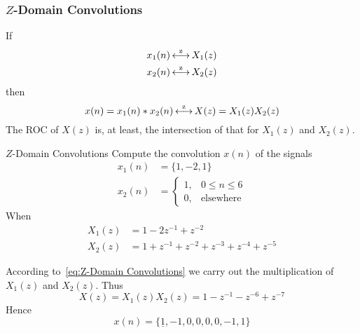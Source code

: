 \subsubsection{\texorpdfstring{$Z$-Domain}{Z-Domain} Convolutions}\label{subsubsec:Z-Domain Convolutions}
If
\begin{equation*}
  \begin{aligned}
    x_{1}(n) &\operatorname{\overset{z}{\longleftrightarrow}} X_{1}(z) \\
    x_{2}(n) &\operatorname{\overset{z}{\longleftrightarrow}} X_{2}(z) \\
  \end{aligned}
\end{equation*}
then
\begin{equation}\label{eq:Z-Domain Convolutions}
  x(n) = x_{1}(n) * x_{2}(n) \operatorname{\overset{z}{\longleftrightarrow}} X(z) = X_{1}(z)X_{2}(z)
\end{equation}
The ROC of $X(z)$ is, at least, the intersection of that for $X_{1}(z)$ and $X_{2}(z)$.

\begin{example}[Example 3.2.9]{\texorpdfstring{$Z$-Domain}{Z-Domain} Convolutions}
  Compute the convolution $x(n)$ of the signals
  \begin{align*}
    x_{1}(n) &= \lbrace 1, -2, 1 \rbrace \\
    x_{2}(n) &= \begin{cases}
      1, & 0 \leq n \leq 6 \\
      0, & \text{elsewhere}
    \end{cases}
  \end{align*}
  When
  \begin{align*}
    X_{1}(z) &= 1-2z^{-1}+z^{-2} \\
    X_{2}(z) &= 1 + z^{-1} + z^{-2} + z^{-3} + z^{-4} + z^{-5}
  \end{align*}

  \tcblower

  According to~\eqref{eq:Z-Domain Convolutions} we carry out the multiplication of $X_{1}(z)$ and $X_{2}(z)$.
  Thus
  \begin{equation*}
    X(z) = X_{1}(z)X_{2}(z) = 1-z^{-1}-z^{-6}+z^{-7}
  \end{equation*}
  Hence
  \begin{equation*}
    x(n) = \lbrace \underline{1}, -1, 0, 0, 0, 0, -1, 1 \rbrace
  \end{equation*}
\end{example}

